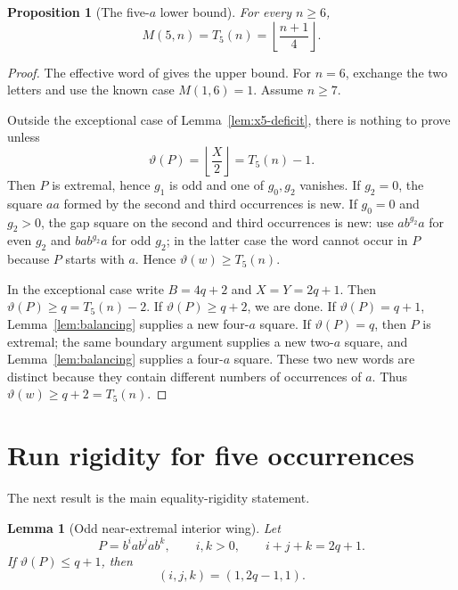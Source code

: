 \documentclass[11pt]{article}
\newtheorem{proposition}[theorem]{Proposition}
\newtheorem{lemma}[theorem]{Lemma}
\theoremstyle{definition}
\newcommand{\thetaas}{\vartheta}
\begin{document}
\begin{proposition}[The five-$a$ lower bound]\label{prop:x5-value}
For every $n\ge6$,
\[
 M(5,n)=T_5(n)=\left\lfloor\frac{n+1}{4}\right\rfloor.
\]
\end{proposition}

\begin{proof}
The effective word of \cite[Theorem~12]{FMMS2026} gives the upper bound. For $n=6$, exchange the two letters and use the known case $M(1,6)=1$. Assume $n\ge7$.

Outside the exceptional case of Lemma~\ref{lem:x5-deficit}, there is nothing to prove unless
\[
 \thetaas(P)=\left\lfloor\frac X2\right\rfloor=T_5(n)-1.
\]
Then $P$ is extremal, hence $g_1$ is odd and one of $g_0,g_2$ vanishes. If $g_2=0$, the square $aa$ formed by the second and third occurrences is new. If $g_0=0$ and $g_2>0$, the gap square on the second and third occurrences is new: use $ab^{g_2}a$ for even $g_2$ and $bab^{g_2}a$ for odd $g_2$; in the latter case the word cannot occur in $P$ because $P$ starts with $a$. Hence $\thetaas(w)\ge T_5(n)$.

In the exceptional case write $B=4q+2$ and $X=Y=2q+1$. Then $\thetaas(P)\ge q=T_5(n)-2$. If $\thetaas(P)\ge q+2$, we are done. If $\thetaas(P)=q+1$, Lemma~\ref{lem:balancing} supplies a new four-$a$ square. If $\thetaas(P)=q$, then $P$ is extremal; the same boundary argument supplies a new two-$a$ square, and Lemma~\ref{lem:balancing} supplies a four-$a$ square. These two new words are distinct because they contain different numbers of occurrences of $a$. Thus $\thetaas(w)\ge q+2=T_5(n)$.
\end{proof}

\section{Run rigidity for five occurrences}

The next result is the main equality-rigidity statement.

\begin{lemma}[Odd near-extremal interior wing]\label{lem:near-extremal-odd}
Let
\[
 P=b^i a b^j a b^k,\qquad i,k>0,\qquad i+j+k=2q+1.
\]
If $\thetaas(P)\le q+1$, then
\[
 (i,j,k)=(1,2q-1,1).
\]
\end{lemma}
\end{document}
